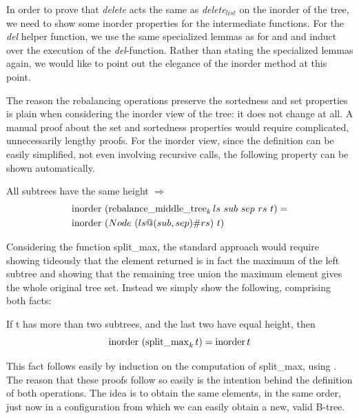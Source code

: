 In order to prove that \textit{delete} acts the same as
\textit{delete}$_{list}$ on the inorder of the tree,
we need to show some inorder properties for the intermediate functions.
For the \textit{del} helper function, 
we use the same specialized lemmas
as for  and 
and induct over the execution of the \textit{del}-function.
Rather than stating the specialized lemmas again, we would like to point
out the elegance of the inorder method at this point.

The reason the rebalancing operations preserve the sortedness and set properties
is plain when considering the inorder view of the tree:
it does not change at all.
A manual proof about the set and sortedness properties
would require complicated, unnecessarily lengthy proofs.
For the inorder view, 
since the definition can be easily simplified,
not even involving recursive calls,
the following property can be shown automatically.

\begin{lemma}
    \label{lem:rebalance-inorder}
    All subtrees have the same height $\Longrightarrow$ \\
    \begin{align*}
    \operatorname{inorder}&\ (\operatorname{rebalance\_middle\_tree}_k ls\ sub\ sep\ rs\ t) =\\
    \operatorname{inorder}&\ (Node\ (ls@(sub,sep)\#rs)\ t)
    \end{align*}
\end{lemma}

Considering the function split\_max,
the standard approach would require showing
tideously that the element returned is in fact the maximum
of the left subtree
and showing that the remaining tree union the maximum element
gives the whole original tree set.
Instead we simply show the following,
comprising both facts:

\begin{lemma}
    \label{lem:splitmax-inorder}
    If t has more than two subtrees, and the last two have equal height, then
    \begin{equation*}
    \operatorname{inorder}\ (\operatorname{split\_max}_k t) = \operatorname{inorder} t
    \end{equation*}
\end{lemma}

This fact follows easily by induction on the computation of split\_max,
using .
The reason that these proofs follow so easily
is the intention behind the definition of both operations.
The idea is to obtain the same elements, in the same order,
just now in a configuration from which we can easily obtain
a new, valid B-tree.

